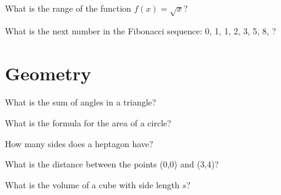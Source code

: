 \documentclass[12pt,a4paper]{book}
\begin{document}
\begin{enhancedmcq}[Functions]{What is the range of the function $f(x) = \sqrt{x}$?}
\end{enhancedmcq}

\begin{enhancedmcq}[Sequences]{What is the next number in the Fibonacci sequence: 0, 1, 1, 2, 3, 5, 8, ?}
\end{enhancedmcq}

\section{Geometry}

\begin{enhancedmcq}[Triangles]{What is the sum of angles in a triangle?}
\end{enhancedmcq}

\begin{enhancedmcq}[Circles]{What is the formula for the area of a circle?}
\end{enhancedmcq}

\begin{enhancedmcq}[Polygons]{How many sides does a heptagon have?}
\end{enhancedmcq}

\begin{enhancedmcq}{What is the distance between the points (0,0) and (3,4)?}
\end{enhancedmcq}

\begin{enhancedmcq}{What is the volume of a cube with side length $s$?}
\end{enhancedmcq}
\end{document}
